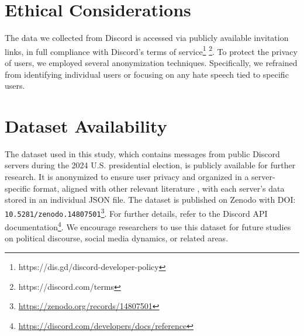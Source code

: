 \section{Ethical Considerations}
\label{sec:ethics}
The data we collected from Discord is accessed via publicly available invitation links, in full compliance with Discord’s terms of service\footnote{https://dis.gd/discord-developer-policy} \footnote{https://discord.com/terms}.  To protect the privacy of users, we employed several anonymization techniques. Specifically, we refrained from identifying individual users or focusing on any hate speech tied to specific users.

\section{Dataset Availability}
The dataset used in this study, which contains messages from public Discord servers during the 2024 U.S. presidential election, is publicly available for further research. It is anonymized to ensure user privacy and organized in a server-specific format, aligned with other relevant literature \cite{aquino2025discordunveiledcomprehensivedataset}, with each server's data stored in an individual JSON file. The dataset is published on Zenodo with DOI: \texttt{10.5281/zenodo.14807501}\footnote{\url{https://zenodo.org/records/14807501}}. For further details, refer to the Discord API documentation\footnote{\url{https://discord.com/developers/docs/reference}}. We encourage researchers to use this dataset for future studies on political discourse, social media dynamics, or related areas.


